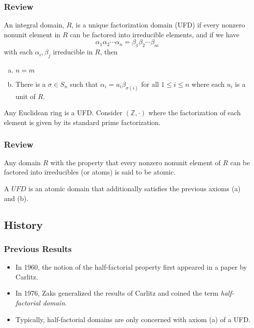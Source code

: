 \begin{frame}
  \frametitle{Review}
  \begin{definition}
    An integral domain, $R$, is a \alert{unique factorization domain (UFD)} if every nonzero nonunit element in $R$ can be factored into irreducible elements, and if we have
    $$ \alpha_1 \alpha_2 \cdots \alpha_n = \beta_1 \beta_2 \cdots \beta_m $$
    with each $\alpha_i, \beta_j$ irreducible in $R$, then
    \begin{enumerate}[(a)]
      \item $n = m$
      \item There is a $\sigma \in S_n$ such that $\alpha_i = u_i \beta_{\sigma(i)}$ for all $1 \leq i \leq n$ where each $u_i$ is a unit of $R$.
    \end{enumerate}
  \end{definition}
\end{frame}
\begin{frame}
  \begin{example}
    Any Euclidean ring is a UFD.
    Consider $(\mathbb{Z}, \cdot)$ where the factorization of each element is given by its standard prime factorization.
  \end{example}
\end{frame}

\begin{frame}
  \frametitle{Review}
  \begin{definition}
    Any domain $R$ with the property that every nonzero nonunit element of $R$ can be factored into irreducibles (or atoms) is said to be \alert{atomic}.
  \end{definition}
  \pause
  \begin{fact}
    A $UFD$ is an atomic domain that additionally satisfies the previous axioms (a) and (b).
  \end{fact}
\end{frame}

\subsection{History}

\begin{frame}
  \frametitle{Previous Results}
  \begin{itemize}
    \item<1-> In 1960, the notion of the half-factorial property first appeared in a paper by Carlitz.
    \item<2-> In 1976, Zaks generalized the results of Carlitz and coined the term \emph{half-factorial domain}.
    \item<3-> Typically, half-factorial domains are only concerned with axiom (a) of a UFD.
  \end{itemize}
\end{frame}


